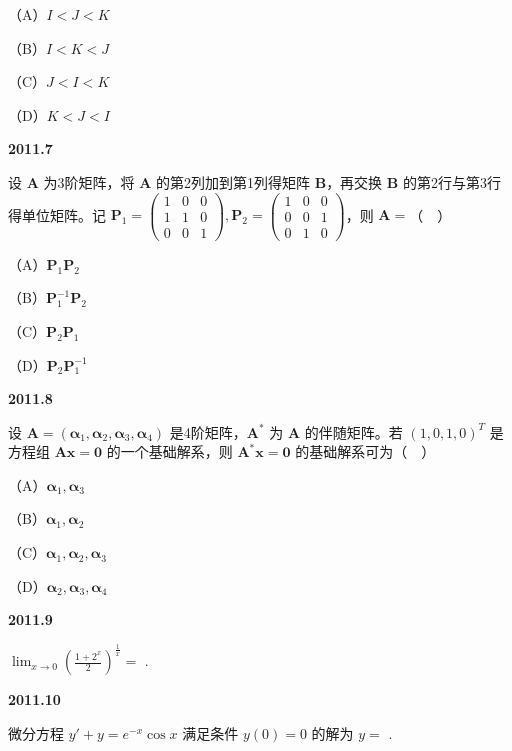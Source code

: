 \documentclass[UTF8,12pt,fontset=windows]{ctexart}
\begin{document}
（A）$I < J < K$

（B）$I < K < J$

（C）$J < I < K$

（D）$K < J < I$

\vfill
\newpage
{\large\bfseries 2011.7}

设 $\boldsymbol{A}$ 为3阶矩阵，将 $\boldsymbol{A}$ 的第2列加到第1列得矩阵 $\boldsymbol{B}$，再交换 $\boldsymbol{B}$ 的第2行与第3行得单位矩阵。记 $\boldsymbol{P}_1 = \begin{pmatrix} 1 & 0 & 0 \\ 1 & 1 & 0 \\ 0 & 0 & 1 \end{pmatrix}, \boldsymbol{P}_2 = \begin{pmatrix} 1 & 0 & 0 \\ 0 & 0 & 1 \\ 0 & 1 & 0 \end{pmatrix}$，则 $\boldsymbol{A} =$（　）

（A）$\boldsymbol{P}_1\boldsymbol{P}_2$

（B）$\boldsymbol{P}_1^{-1}\boldsymbol{P}_2$

（C）$\boldsymbol{P}_2\boldsymbol{P}_1$

（D）$\boldsymbol{P}_2\boldsymbol{P}_1^{-1}$

\vfill
\newpage
{\large\bfseries 2011.8}

设 $\boldsymbol{A} = (\boldsymbol{\alpha}_1, \boldsymbol{\alpha}_2, \boldsymbol{\alpha}_3, \boldsymbol{\alpha}_4)$ 是4阶矩阵，$\boldsymbol{A}^*$ 为 $\boldsymbol{A}$ 的伴随矩阵。若 $(1, 0, 1, 0)^T$ 是方程组 $\boldsymbol{Ax} = \boldsymbol{0}$ 的一个基础解系，则 $\boldsymbol{A}^*\boldsymbol{x} = \boldsymbol{0}$ 的基础解系可为（　）

（A）$\boldsymbol{\alpha}_1, \boldsymbol{\alpha}_3$

（B）$\boldsymbol{\alpha}_1, \boldsymbol{\alpha}_2$

（C）$\boldsymbol{\alpha}_1, \boldsymbol{\alpha}_2, \boldsymbol{\alpha}_3$

（D）$\boldsymbol{\alpha}_2, \boldsymbol{\alpha}_3, \boldsymbol{\alpha}_4$

\vfill
\newpage
{\large\bfseries 2011.9}

$\lim_{x \to 0}\left(\frac{1 + 2^x}{2}\right)^{\frac{1}{x}} =$ \underline{\hspace{20mm}}.

\vfill
\newpage
{\large\bfseries 2011.10}

微分方程 $y' + y = e^{-x}\cos x$ 满足条件 $y(0) = 0$ 的解为 $y =$ \underline{\hspace{20mm}}.
\end{document}
